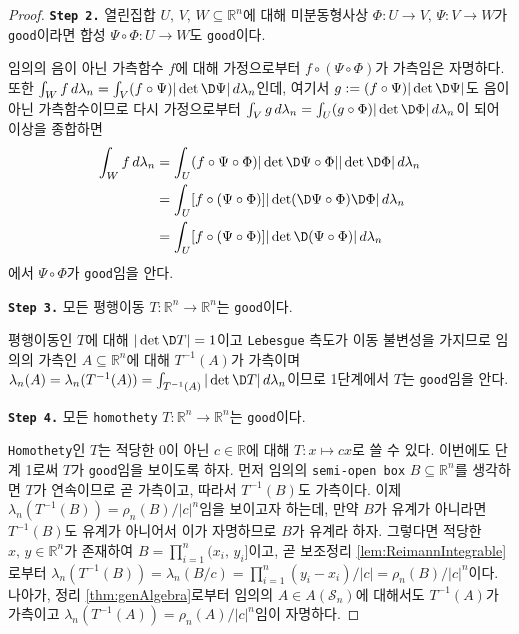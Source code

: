 \begin{proof}
    \noindent\texttt{\textbf{Step 2.}} 열린집합 $U,\,V,\,W\subseteq\mathbb{R}^n$에 대해 미분동형사상 $\Phi:U\to V,\,\Psi:V\to W$가 \texttt{good}이라면 합성 $\Psi\circ\Phi:U\to W$도 \texttt{good}이다.

    임의의 음이 아닌 가측함수 $f$에 대해 가정으로부터 $f\circ(\Psi\circ\Phi)$가 가측임은 자명하다. 또한 $\int_Wf\,d\lambda_n=\int_V(f\circ\Psi)|\det\D\Psi|\,d\lambda_n$인데, 여기서 $g:=(f\circ\Psi)|\det\D\Psi|$도 음이 아닌 가측함수이므로 다시 가정으로부터 $\int_Vg\,d\lambda_n=\int_U(g\circ\Phi)|\det\D\Phi|\,d\lambda_n$이 되어 이상을 종합하면
    \begin{align*}
        \int_Wf\,d\lambda_n&=\int_U(f\circ\Psi\circ\Phi)|\det\D\Psi\circ\Phi||\det\D\Phi|\,d\lambda_n\\
        &=\int_U[f\circ(\Psi\circ\Phi)]|\det(\D\Psi\circ\Phi)\D\Phi|\,d\lambda_n\\
        &=\int_U[f\circ(\Psi\circ\Phi)]|\det\D(\Psi\circ\Phi)|\,d\lambda_n
    \end{align*}
    에서 $\Psi\circ\Phi$가 \texttt{good}임을 안다.

    \noindent\texttt{\textbf{Step 3.}} 모든 평행이동 $T:\mathbb{R}^n\to\mathbb{R}^n$는 \texttt{good}이다.

    평행이동인 $T$에 대해 $|\det\D T|=1$이고 \texttt{Lebesgue} 측도가 이동 불변성을 가지므로 임의의 가측인 $A\subseteq\mathbb{R}^n$에 대해 $T^{-1}(A)$가 가측이며 $\lambda_n(A)=\lambda_n(T^{-1}(A))=\int_{T^{-1}(A)}|\det\D T|\,d\lambda_n$이므로 1단계에서 $T$는 \texttt{good}임을 안다.

    \noindent\texttt{\textbf{Step 4.}} 모든 \texttt{homothety} $T:\mathbb{R}^n\to\mathbb{R}^n$는 \texttt{good}이다.

    \texttt{Homothety}인 $T$는 적당한 0이 아닌 $c\in\mathbb{R}$에 대해 $T:x\mapsto cx$로 쓸 수 있다. 이번에도 단계 1로써 $T$가 \texttt{good}임을 보이도록 하자. 먼저 임의의 \texttt{semi-open box} $B\subseteq\mathbb{R}^n$를 생각하면 $T$가 연속이므로 곧 가측이고, 따라서 $T^{-1}(B)$도 가측이다. 이제 $\lambda_n(T^{-1}(B))=\rho_n(B)/|c|^n$임을 보이고자 하는데, 만약 $B$가 유계가 아니라면 $T^{-1}(B)$도 유계가 아니어서 이가 자명하므로 $B$가 유계라 하자. 그렇다면 적당한 $x,\,y\in\mathbb{R}^n$가 존재하여 $B=\prod_{i=1}^n(x_i,\,y_i]$이고, 곧 보조정리 \ref{lem:ReimannIntegrable}로부터 $\lambda_n(T^{-1}(B))=\lambda_n(B/c)=\prod_{i=1}^n(y_i-x_i)/|c|=\rho_n(B)/|c|^n$이다.\footnotemark\label{note:rotateSemiOpenBox} 나아가, 정리 \ref{thm:genAlgebra}로부터 임의의 $A\in A(\mathcal{S}_n)$에 대해서도 $T^{-1}(A)$가 가측이고 $\lambda_n(T^{-1}(A))=\rho_n(A)/|c|^n$임이 자명하다.
    

\end{proof}
